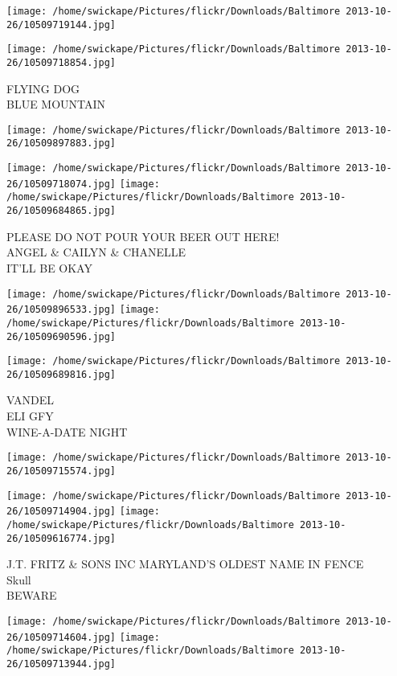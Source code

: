 \documentclass[10pt,letterpaper]{article}
\begin{document}
\texttt{[image: /home/swickape/Pictures/flickr/Downloads/Baltimore 2013-10-26/10509719144.jpg]}

\vspace{0.25in}
\texttt{[image: /home/swickape/Pictures/flickr/Downloads/Baltimore 2013-10-26/10509718854.jpg]}

FLYING DOG\\
BLUE MOUNTAIN
\pagebreak

\texttt{[image: /home/swickape/Pictures/flickr/Downloads/Baltimore 2013-10-26/10509897883.jpg]}

\vspace{0.25in}
\texttt{[image: /home/swickape/Pictures/flickr/Downloads/Baltimore 2013-10-26/10509718074.jpg]}
\texttt{[image: /home/swickape/Pictures/flickr/Downloads/Baltimore 2013-10-26/10509684865.jpg]}

PLEASE DO NOT POUR YOUR BEER OUT HERE!\\
ANGEL \& CAILYN \& CHANELLE\\
IT'LL BE OKAY
\pagebreak

\texttt{[image: /home/swickape/Pictures/flickr/Downloads/Baltimore 2013-10-26/10509896533.jpg]}
\texttt{[image: /home/swickape/Pictures/flickr/Downloads/Baltimore 2013-10-26/10509690596.jpg]}

\vspace{0.25in}
\texttt{[image: /home/swickape/Pictures/flickr/Downloads/Baltimore 2013-10-26/10509689816.jpg]}

VANDEL\\
ELI GFY\\
WINE{-}A{-}DATE NIGHT
\pagebreak

\texttt{[image: /home/swickape/Pictures/flickr/Downloads/Baltimore 2013-10-26/10509715574.jpg]}

\vspace{0.25in}
\texttt{[image: /home/swickape/Pictures/flickr/Downloads/Baltimore 2013-10-26/10509714904.jpg]}
\texttt{[image: /home/swickape/Pictures/flickr/Downloads/Baltimore 2013-10-26/10509616774.jpg]}

J.T. FRITZ \& SONS INC MARYLAND'S OLDEST NAME IN FENCE\\
Skull\\
BEWARE
\pagebreak

\texttt{[image: /home/swickape/Pictures/flickr/Downloads/Baltimore 2013-10-26/10509714604.jpg]}
\texttt{[image: /home/swickape/Pictures/flickr/Downloads/Baltimore 2013-10-26/10509713944.jpg]}
\end{document}
